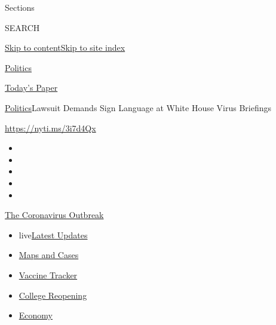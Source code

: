 Sections

SEARCH

\protect\hyperlink{site-content}{Skip to
content}\protect\hyperlink{site-index}{Skip to site index}

\href{https://www.nytimes.com/section/politics}{Politics}

\href{https://myaccount.nytimes.com/auth/login?response_type=cookie\&client_id=vi}{}

\href{https://www.nytimes.com/section/todayspaper}{Today's Paper}

\href{/section/politics}{Politics}\textbar{}Lawsuit Demands Sign
Language at White House Virus Briefings

\url{https://nyti.ms/3i7d4Qx}

\begin{itemize}
\item
\item
\item
\item
\item
\end{itemize}

\href{https://www.nytimes.com/news-event/coronavirus?action=click\&pgtype=Article\&state=default\&region=TOP_BANNER\&context=storylines_menu}{The
Coronavirus Outbreak}

\begin{itemize}
\tightlist
\item
  live\href{https://www.nytimes.com/2020/08/04/world/coronavirus-cases.html?action=click\&pgtype=Article\&state=default\&region=TOP_BANNER\&context=storylines_menu}{Latest
  Updates}
\item
  \href{https://www.nytimes.com/interactive/2020/us/coronavirus-us-cases.html?action=click\&pgtype=Article\&state=default\&region=TOP_BANNER\&context=storylines_menu}{Maps
  and Cases}
\item
  \href{https://www.nytimes.com/interactive/2020/science/coronavirus-vaccine-tracker.html?action=click\&pgtype=Article\&state=default\&region=TOP_BANNER\&context=storylines_menu}{Vaccine
  Tracker}
\item
  \href{https://www.nytimes.com/2020/08/02/us/covid-college-reopening.html?action=click\&pgtype=Article\&state=default\&region=TOP_BANNER\&context=storylines_menu}{College
  Reopening}
\item
  \href{https://www.nytimes.com/live/2020/08/04/business/stock-market-today-coronavirus?action=click\&pgtype=Article\&state=default\&region=TOP_BANNER\&context=storylines_menu}{Economy}
\end{itemize}


